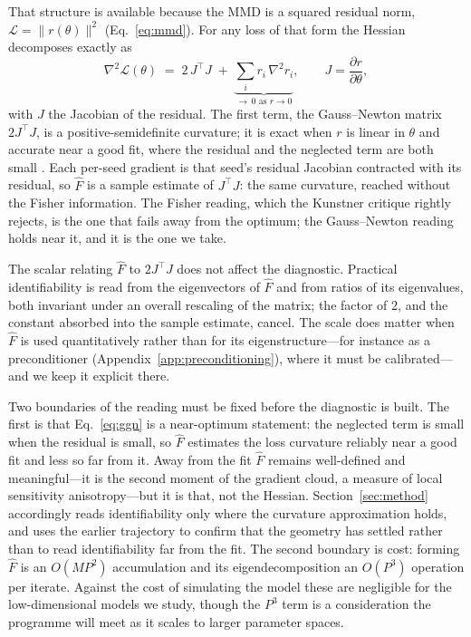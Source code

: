 \documentclass[10pt,twocolumn]{article}
\newcommand{\Fhat}{\hat{F}}
\newcommand{\Ltot}{\mathcal{L}}
\begin{document}
That structure is available because the MMD is a squared residual norm,
$\Ltot = \|r(\theta)\|^2$ (Eq.~\ref{eq:mmd}). For any loss of that form the Hessian
decomposes exactly as
\begin{equation}
  \nabla^2 \Ltot(\theta) \;=\; 2\,J^\top J
  \;+\; \underbrace{\textstyle\sum_i r_i\, \nabla^2 r_i}_{\to\,0 \text{ as } r\to 0},
  \qquad J = \frac{\partial r}{\partial \theta},
  \label{eq:ggn}
\end{equation}
with $J$ the Jacobian of the residual. The first term, the Gauss--Newton matrix
$2J^\top J$, is a positive-semidefinite curvature; it is exact when $r$ is linear in
$\theta$ and accurate near a good fit, where the residual and the neglected term are
both small \citep{botev2017practical, martens2020new}. Each per-seed gradient is
that seed's residual Jacobian contracted with its residual, so $\Fhat$ is a sample
estimate of $J^\top J$: the same curvature, reached without the Fisher information.
The Fisher reading, which the Kunstner critique rightly rejects, is the one that
fails away from the optimum; the Gauss--Newton reading holds near it, and it is the
one we take.

The scalar relating $\Fhat$ to $2J^\top J$ does not affect the diagnostic. Practical
identifiability is read from the eigenvectors of $\Fhat$ and from ratios of its
eigenvalues, both invariant under an overall rescaling of the matrix; the factor of
$2$, and the constant absorbed into the sample estimate, cancel. The scale does
matter when $\Fhat$ is used quantitatively rather than for its eigenstructure---for
instance as a preconditioner (Appendix~\ref{app:preconditioning}), where it must be
calibrated---and we keep it explicit there.

Two boundaries of the reading must be fixed before the diagnostic is built. The
first is that Eq.~\eqref{eq:ggn} is a near-optimum statement: the neglected term is
small when the residual is small, so $\Fhat$ estimates the loss curvature reliably
near a good fit and less so far from it. Away from the fit $\Fhat$ remains
well-defined and meaningful---it is the second moment of the gradient cloud, a
measure of local sensitivity anisotropy---but it is that, not the Hessian.
Section~\ref{sec:method} accordingly reads identifiability only where the curvature
approximation holds, and uses the earlier trajectory to confirm that the geometry
has settled rather than to read identifiability far from the fit. The second
boundary is cost: forming $\Fhat$ is an $O(MP^2)$ accumulation and its
eigendecomposition an $O(P^3)$ operation per iterate. Against the cost of simulating
the model these are negligible for the low-dimensional models we study, though the
$P^3$ term is a consideration the programme will meet as it scales to larger
parameter spaces.
\end{document}
